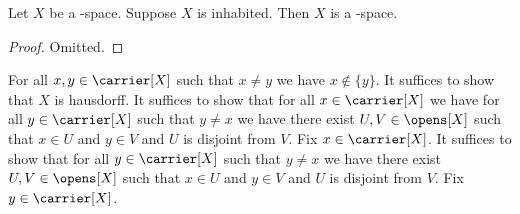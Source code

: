 \begin{proposition}\label{teethree_space_is_teetwo_space}
    Let $X$ be a \teethree-space.
    Suppose $X$ is inhabited.
    Then $X$ is a \teetwo-space.
\end{proposition}
\begin{proof}
    Omitted.
\end{proof}
    For all $x,y \in \carrier[X]$ such that $x \neq y$ we have $x \notin \{y\}$.
    It suffices to show that $X$ is hausdorff.
    It suffices to show that for all $x \in \carrier[X]$ we have for all $y \in \carrier[X]$ such that $y \neq x$ we have there exist $U,V \in \opens[X]$ such that $x\in U$ and $y \in V$ and $U$ is disjoint from $V$.
    Fix $x \in \carrier[X]$.
    It suffices to show that for all $y \in \carrier[X]$ such that $y \neq x$ we have there exist $U,V \in \opens[X]$ such that $x\in U$ and $y \in V$ and $U$ is disjoint from $V$.
    Fix $y \in \carrier[X]$.


